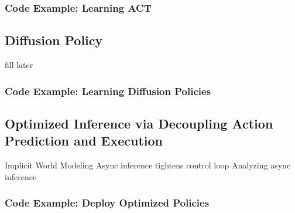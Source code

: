 \subsubsection{Code Example: Learning ACT}

\subsection{Diffusion Policy}
fill later

\subsubsection{Code Example: Learning Diffusion Policies}

\subsection{Optimized Inference via Decoupling Action Prediction and Execution}
Implicit World Modeling 
Async inference tightens control loop
Analyzing async inference

\subsubsection{Code Example: Deploy Optimized Policies}
